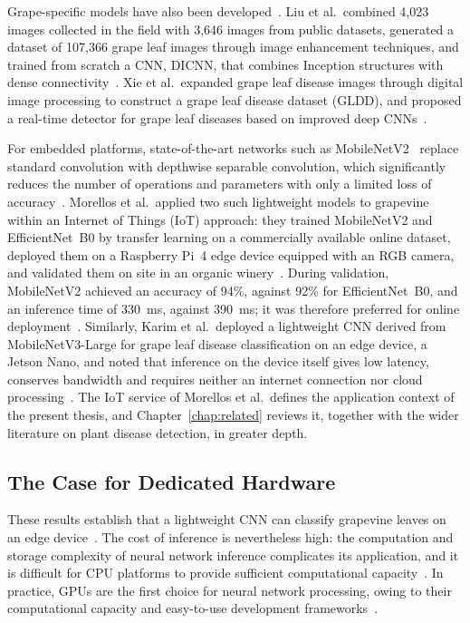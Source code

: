 Grape-specific models have also been
developed~\cite{liu2020grape,xie2020deep}. Liu et al.\ combined 4,023 images
collected in the field with 3,646 images from public datasets, generated a
dataset of 107,366 grape leaf images through image enhancement techniques, and
trained from scratch a CNN, DICNN, that combines Inception structures with
dense connectivity~\cite{liu2020grape}. Xie et al.\ expanded grape leaf
disease images through digital image processing to construct a grape leaf
disease dataset (GLDD), and proposed a real-time detector for grape leaf
diseases based on improved deep CNNs~\cite{xie2020deep}.

For embedded platforms, state-of-the-art networks such as
MobileNetV2~\cite{sandler2018mobilenetv2} replace standard convolution with
depthwise separable convolution, which significantly reduces the number of
operations and parameters with only a limited loss of
accuracy~\cite{bai2018dwsep}. Morellos et al.\ applied two such lightweight
models to grapevine within an Internet of Things (IoT) approach: they trained
MobileNetV2 and EfficientNet~B0 by transfer learning on a commercially
available online dataset, deployed them on a Raspberry Pi~4 edge device
equipped with an RGB camera, and validated them on site in an organic
winery~\cite{morellos2024iot}. During validation, MobileNetV2 achieved an
accuracy of 94\%, against 92\% for EfficientNet~B0, and an inference time of
\SI{330}{\milli\second}, against \SI{390}{\milli\second}; it was therefore
preferred for online deployment~\cite{morellos2024iot}. Similarly, Karim et
al.\ deployed a lightweight CNN derived from MobileNetV3-Large for grape leaf
disease classification on an edge device, a Jetson Nano, and noted that
inference on the device itself gives low latency, conserves bandwidth and
requires neither an internet connection nor cloud
processing~\cite{karim2024grapeedge}. The IoT service of Morellos et al.\
defines the application context of the present thesis, and
Chapter~\ref{chap:related} reviews it, together with the wider literature on
plant disease detection, in greater depth.


\subsection{The Case for Dedicated Hardware}
\label{sec:motivation-hardware}

These results establish that a lightweight CNN can classify grapevine leaves
on an edge device~\cite{morellos2024iot,karim2024grapeedge}. The cost of
inference is nevertheless high: the computation and storage complexity of
neural network inference complicates its application, and it is difficult for
CPU platforms to provide sufficient computational
capacity~\cite{guo2019survey}. In practice, GPUs are the first choice for
neural network processing, owing to their computational capacity and
easy-to-use development frameworks~\cite{guo2019survey}.

